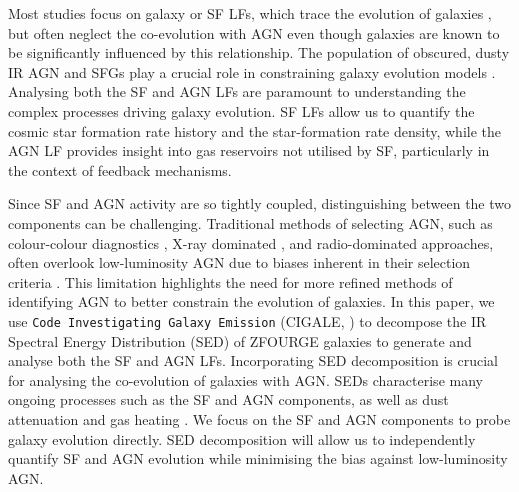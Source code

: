 Most studies focus on galaxy or SF LFs, which trace the evolution of galaxies \citep{tempel_tracing_2011, cool_galaxy_2012}, but often neglect the co-evolution with AGN \citep{fotopoulou_5-10_2016, symeonidis_agn_2021, finkelstein_coevolution_2022} even though galaxies are known to be significantly influenced by this relationship\citep{hopkins_cosmological_2008, fiore_agn_2017}. The population of obscured, dusty IR AGN and SFGs play a crucial role in constraining galaxy evolution models \citep{gruppioni_modelling_2011}. Analysing both the SF and AGN LFs are paramount to understanding the complex processes driving galaxy evolution. SF LFs allow us to quantify the cosmic star formation rate history and the star-formation rate density, while the AGN LF provides insight into gas reservoirs not utilised by SF, particularly in the context of feedback mechanisms.

Since SF and AGN activity are so tightly coupled, distinguishing between the two components can be challenging. Traditional methods of selecting AGN, such as colour-colour diagnostics \citep{lacy_obscured_2004}, X-ray dominated \citep{szokoly_chandra_2004}, and radio-dominated \citep{rees_radio_2016} approaches, often overlook low-luminosity AGN due to biases inherent in their selection criteria \citep{thorne_deep_2022}. This limitation highlights the need for more refined methods of identifying AGN to better constrain the evolution of galaxies. In this paper, we use \texttt{Code Investigating Galaxy Emission} (CIGALE, \citealp{burgarella_star_2005, noll_analysis_2009, boquien_cigale_2019}) to decompose the IR Spectral Energy Distribution (SED) of ZFOURGE galaxies \citep{straatman_fourstar_2016} to generate and analyse both the SF and AGN LFs. Incorporating SED decomposition is crucial for analysing the co-evolution of galaxies with AGN. SEDs characterise many ongoing processes such as the SF and AGN components, as well as dust attenuation and gas heating \citep{huang_local_2007, ho_spectral_1999, silva_modelling_2011, gruppioni_modelling_2011}. We focus on the SF and AGN components to probe galaxy evolution directly. SED decomposition will allow us to independently quantify SF and AGN evolution while minimising the bias against low-luminosity AGN.

